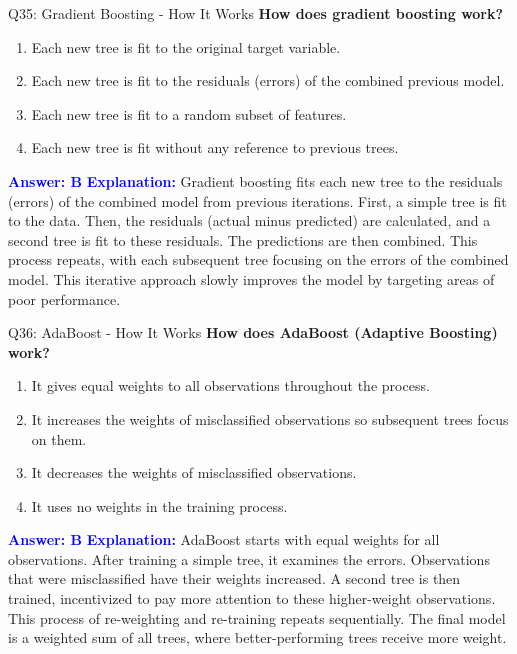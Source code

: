\documentclass[8pt]{beamer}
\begin{document}
	\begin{frame}{Q35: Gradient Boosting - How It Works}
		\fontsize{6.5}{7.5}\selectfont
		\textbf{How does gradient boosting work?}
		\begin{enumerate}
			\item Each new tree is fit to the original target variable.
			\item Each new tree is fit to the residuals (errors) of the combined previous model.
			\item Each new tree is fit to a random subset of features.
			\item Each new tree is fit without any reference to previous trees.
		\end{enumerate}
		\vspace{0.1cm}
		\textcolor{blue}{\textbf{Answer: B}}
		\vspace{0.1cm}
		\textcolor{blue}{\textbf{Explanation:}} Gradient boosting fits each new tree to the residuals (errors) of the combined model from previous iterations. First, a simple tree is fit to the data. Then, the residuals (actual minus predicted) are calculated, and a second tree is fit to these residuals. The predictions are then combined. This process repeats, with each subsequent tree focusing on the errors of the combined model. This iterative approach slowly improves the model by targeting areas of poor performance.
	\end{frame}
	
	\begin{frame}{Q36: AdaBoost - How It Works}
		\fontsize{6.5}{7.5}\selectfont
		\textbf{How does AdaBoost (Adaptive Boosting) work?}
		\begin{enumerate}
			\item It gives equal weights to all observations throughout the process.
			\item It increases the weights of misclassified observations so subsequent trees focus on them.
			\item It decreases the weights of misclassified observations.
			\item It uses no weights in the training process.
		\end{enumerate}
		\vspace{0.1cm}
		\textcolor{blue}{\textbf{Answer: B}}
		\vspace{0.1cm}
		\textcolor{blue}{\textbf{Explanation:}} AdaBoost starts with equal weights for all observations. After training a simple tree, it examines the errors. Observations that were misclassified have their weights increased. A second tree is then trained, incentivized to pay more attention to these higher-weight observations. This process of re-weighting and re-training repeats sequentially. The final model is a weighted sum of all trees, where better-performing trees receive more weight.
	\end{frame}
	
\end{document}
